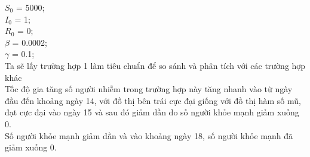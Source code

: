\documentclass[a4paper]{article}
\begin{document}
\begin{flushleft}
$S_0$ = 5000;\\
$I_0$ = 1;\\
$R_0$ = 0;\\
$\beta$ = 0.0002;\\
$\gamma$ = 0.1;\\
Ta sẽ lấy trường hợp 1 làm tiêu chuẩn để so sánh và phân tích với các trường hợp khác\\
Tốc độ gia tăng số người nhiễm trong trường hợp này tăng nhanh vào từ ngày đầu đến khoảng ngày 14, với đồ thị bên trái cực đại giống với đồ thị hàm số mũ, đạt cực đại vào ngày 15 và sau đó giảm dần do số người khỏe mạnh giảm xuống 0.\\
Số người khỏe mạnh giảm dần và vào khoảng ngày 18, số người khỏe mạnh đã giảm xuống 0.



\end{flushleft}
\end{document}
